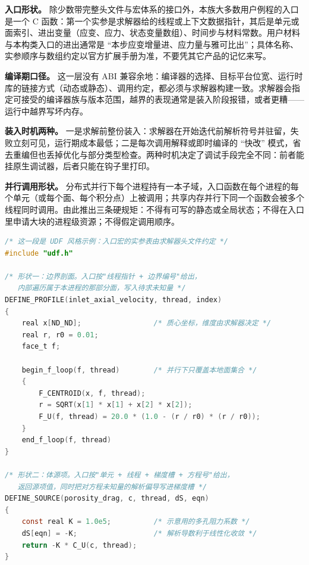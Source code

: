 \documentclass[12pt,a4paper,fontset=fandol]{ctexbook}
\begin{document}
\textbf{入口形状。} 除少数带完整头文件与宏体系的接口外，本族大多数用户例程的入口是一个 C 函数：第一个实参是求解器给的线程或上下文数据指针，其后是单元或面索引、进出变量（应变、应力、状态变量数组）、时间步与材料常数。用户材料与本构类入口的进出通常是 ``本步应变增量进、应力量与雅可比出''；具体名称、实参顺序与数组约定以官方扩展手册为准，不要凭其它产品的记忆来写。

\textbf{编译期口径。} 这一层没有 ABI 兼容余地：编译器的选择、目标平台位宽、运行时库的链接方式（动态或静态）、调用约定，都必须与求解器构建一致。求解器会指定可接受的编译器族与版本范围，越界的表现通常是装入阶段报错，或者更糟——运行中越界写坏内存。

\textbf{装入时机两种。} 一是求解前整份装入：求解器在开始迭代前解析符号并驻留，失败立刻可见，运行期成本最低；二是每次调用解释或即时编译的 ``快改'' 模式，省去重编但也丢掉优化与部分类型检查。两种时机决定了调试手段完全不同：前者能挂原生调试器，后者只能在钩子里打印。

\textbf{并行调用形状。} 分布式并行下每个进程持有一本子域，入口函数在每个进程的每个单元（或每个面、每个积分点）上被调用；共享内存并行下同一个函数会被多个线程同时调用。由此推出三条硬规矩：不得有可写的静态或全局状态；不得在入口里申请大块的进程级资源；不得假定调用顺序。

\begin{lstlisting}[language=C, style=cstyle,
  caption={钩子入口的两个典型形状：面剖面与体源项（Fluent UDF 风格）},
  label={lst:ch02-udf-shape}]
/* 这一段是 UDF 风格示例：入口宏的实参表由求解器头文件约定 */
#include "udf.h"

/* 形状一：边界剖面。入口按"线程指针 + 边界编号"给出，
   内部遍历属于本进程的那部分面，写入待求未知量 */
DEFINE_PROFILE(inlet_axial_velocity, thread, index)
{
    real x[ND_ND];                 /* 质心坐标，维度由求解器决定 */
    real r, r0 = 0.01;
    face_t f;

    begin_f_loop(f, thread)        /* 并行下只覆盖本地面集合 */
    {
        F_CENTROID(x, f, thread);
        r = SQRT(x[1] * x[1] + x[2] * x[2]);
        F_U(f, thread) = 20.0 * (1.0 - (r / r0) * (r / r0));
    }
    end_f_loop(f, thread)
}

/* 形状二：体源项。入口按"单元 + 线程 + 梯度槽 + 方程号"给出，
   返回源项值，同时把对方程未知量的解析偏导写进梯度槽 */
DEFINE_SOURCE(porosity_drag, c, thread, dS, eqn)
{
    const real K = 1.0e5;          /* 示意用的多孔阻力系数 */
    dS[eqn] = -K;                  /* 解析导数利于线性化收敛 */
    return -K * C_U(c, thread);
}
\end{lstlisting}
\end{document}
